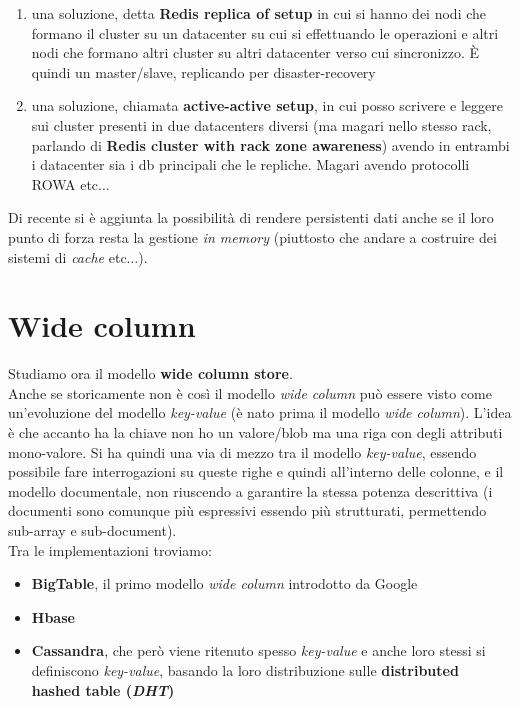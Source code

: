 \documentclass[a4paper,12pt, oneside]{book}
\begin{document}
\begin{enumerate}
  \item una soluzione, detta \textbf{Redis replica of setup} in cui si hanno dei
  nodi che formano il cluster su un datacenter su cui si effettuando le
  operazioni e altri nodi che formano altri cluster su altri datacenter verso
  cui sincronizzo. È quindi un master/slave, replicando per disaster-recovery
  \item una soluzione, chiamata \textbf{active-active setup}, in cui posso
  scrivere e leggere sui cluster presenti in due datacenters diversi (ma magari
  nello stesso rack, parlando di \textbf{Redis cluster with rack zone
    awareness}) avendo in entrambi i datacenter sia i db principali che le
  repliche. Magari avendo protocolli ROWA etc$\ldots$
\end{enumerate}
Di recente si è aggiunta la possibilità di rendere persistenti dati anche se il
loro punto di forza resta la gestione \textit{in memory} (piuttosto che andare a
costruire dei sistemi di \textit{cache} etc$\ldots$).
\section{Wide column}
Studiamo ora il modello \textbf{wide column store}.\\
Anche se storicamente non è così il modello \textit{wide column} può essere
visto come un'evoluzione del modello \textit{key-value} (è nato prima il modello
\textit{wide column}). L'idea è che accanto ha la chiave non ho un valore/blob
ma una riga con degli attributi mono-valore. Si ha quindi una via di mezzo tra
il modello \textit{key-value}, essendo possibile fare interrogazioni su queste
righe e quindi all'interno delle colonne, e il modello documentale, non
riuscendo a garantire la stessa potenza descrittiva (i documenti sono comunque
più espressivi essendo più strutturati, permettendo sub-array e sub-document).\\
Tra le implementazioni troviamo:
\begin{itemize}
  \item \textbf{BigTable}, il primo modello \textit{wide column} introdotto da
  Google
  \item \textbf{Hbase}
  \item \textbf{Cassandra}, che però viene ritenuto spesso \textit{key-value} e
  anche loro stessi si definiscono \textit{key-value}, basando la loro
  distribuzione sulle \textbf{distributed hashed table (\textit{DHT})}
\end{itemize}
\end{document}
